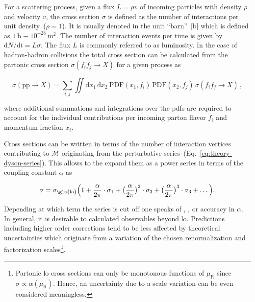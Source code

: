 For a scattering process, given a flux $L=\rho v$ of incoming particles with density $\rho$ and velocity $v$, the cross section $\sigma$ is defined as the number of interactions per unit density~($\rho=1$). It is usually denoted in the unit ``barn''~[$\mathrm{b}$] which is defined as $1~\mathrm{b}\equiv 10^{-28}~\mathrm{m}^{2}$.  The number of interaction events per time is given by $\mathrm{d}N/\mathrm{d}t=L\sigma$. The flux $L$ is commonly referred to as luminosity. In the case of hadron-hadron collisions the total cross section can be calculated from the partonic cross section $\sigma(f_{i}f_{j}\to X)$ for a given process  as

\begin{equation}
\sigma(\mathrm{pp}\to X)=\sum_{i,j}\iint\mathrm{d}x_{1}\,\mathrm{d}x_{2}~\mathrm{PDF}(x_{1},f_{i})\,\mathrm{PDF}(x_{2},f_{j})\,\sigma(f_{i}f_{j}\to X)\,,
\end{equation}

where additional summations and integrations over the \glspl{pdf} are required to account for the individual contributions per incoming parton flavor $f_{i}$ and momentum fraction $x_{i}$.

Cross sections can be written in terms of the number of interaction vertices contributing to $\mathcal{M}$ originating from the perturbative series~(Eq.~\ref{eq:theory-dyson-series}). This allows to the expand them as a power series in terms of the coupling constant $\alpha$ as

\begin{equation}
\sigma=\sigma_\mathrm{\gls{lo}}\Big(1+\frac{\alpha}{2\pi}\cdot\sigma_\mathrm{1}+\big(\frac{\alpha}{2\pi}\big)^2\cdot\sigma_{2}+\big(\frac{\alpha}{2\pi}\big)^{3}\cdot\sigma_{3}+\ldots\Big).
\end{equation}

Depending at which term the series is cut off one speaks of , , or  accuracy in $\alpha$. In general, it is desirable to calculated observables beyond \gls{lo}. Predictions including higher order corrections tend to be less affected by theoretical uncertainties which originate from a variation of the chosen renormalization and factorization scales\footnote{Partonic \gls{lo} cross sections can only be monotonous functions of $\mu_\mathrm{R}$ since $\sigma\propto\alpha(\mu_\mathrm{R})$. Hence, an uncertainty due to a scale variation can be even considered meaningless.}.

